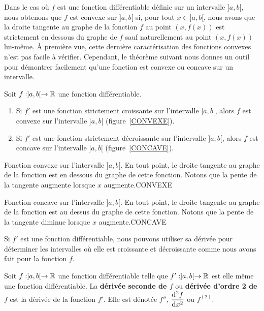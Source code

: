 {Dans le cas où $f$ est une fonction différentiable définie sur un
intervalle $]a,b[$, nous obtenons que $f$ est convexe sur $]a,b[$ si, pour
tout $x \in ]a,b[$, nous avons que la droite tangente au graphe de la
fonction $f$ au point $(x,f(x))$ est strictement en dessous du graphe
de $f$ sauf naturellement au point $(x,f(x))$ lui-même.  À première
vue, cette dernière caractérisation des fonctions convexes n'est pas
facile à vérifier.  Cependant, le théorème suivant nous donnes un
outil pour démontrer facilement qu'une fonction est convexe ou concave
sur un intervalle.

\begin{focus}{\prp}
Soit $f:]a,b[\to \mathbb{R}$ une fonction différentiable.
\begin{enumerate}
\item Si $f'$ est une fonction strictement croissante sur l'intervalle
$]a,b[$, alors $f$ est convexe sur l'intervalle $]a,b[$
(figure~\ref{CONVEXE}).
\item Si $f'$ est une fonction strictement décroissante sur
l'intervalle $]a,b[$, alors $f$ est concave sur l'intervalle $]a,b[$
(figure~\ref{CONCAVE}).
\end{enumerate}
\end{focus}

{Fonction convexe sur l'intervalle $]a,b[$.  En tout point, le droite
tangente au graphe de la fonction est en dessous du graphe de cette
fonction.  Notons que la pente de la tangente augmente lorsque $x$
augmente.}{CONVEXE}

{Fonction concave sur l'intervalle $]a,b[$.  
En tout point, le droite tangente au graphe de la fonction est au
dessus du graphe de cette fonction.  Notons que la pente de la
tangente diminue lorsque $x$ augmente.}{CONCAVE}

Si $f'$ est une fonction différentiable, nous pouvons utiliser sa dérivée
pour déterminer les intervalles où elle est croissante et décroissante
comme nous avons fait pour la fonction $f$.

\begin{focus}{\dfn}
Soit $f:]a,b[\rightarrow \mathbb{R}$ une fonction différentiable telle que
$f':]a,b[\to \mathbb{R}$ est elle même une fonction différentiable.  La
{\bfseries dérivée seconde de $f$} ou {\bfseries dérivée d'ordre 2 de $f$} 
est la dérivée de la fonction $f'$.  Elle est dénotée $f''$,
$\displaystyle \frac{\mathrm{d}^{2}f}{\mathrm{d}x^{2}}$ ou $f^{(2)}$.


\end{focus}}
